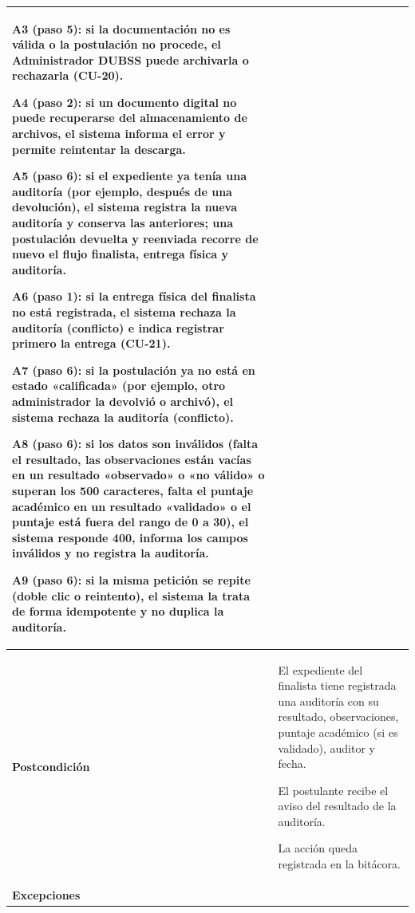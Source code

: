 \begin{longtable}{>{\raggedright\arraybackslash}p{2.9cm} >{\raggedright\arraybackslash}p{12.6cm}}
\begin{cuvin}
    \item A3 (paso 5): si la documentación no es válida o la postulación no procede, el Administrador DUBSS puede archivarla o rechazarla (CU-20).
    \item A4 (paso 2): si un documento digital no puede recuperarse del almacenamiento de archivos, el sistema informa el error y permite reintentar la descarga.
    \item A5 (paso 6): si el expediente ya tenía una auditoría (por ejemplo, después de una devolución), el sistema registra la nueva auditoría y conserva las anteriores; una postulación devuelta y reenviada recorre de nuevo el flujo finalista, entrega física y auditoría.
    \item A6 (paso 1): si la entrega física del finalista no está registrada, el sistema rechaza la auditoría (conflicto) e indica registrar primero la entrega (CU-21).
    \item A7 (paso 6): si la postulación ya no está en estado «calificada» (por ejemplo, otro administrador la devolvió o archivó), el sistema rechaza la auditoría (conflicto).
    \item A8 (paso 6): si los datos son inválidos (falta el resultado, las observaciones están vacías en un resultado «observado» o «no válido» o superan los 500 caracteres, falta el puntaje académico en un resultado «validado» o el puntaje está fuera del rango de 0 a 30), el sistema responde 400, informa los campos inválidos y no registra la auditoría.
    \item A9 (paso 6): si la misma petición se repite (doble clic o reintento), el sistema la trata de forma idempotente y no duplica la auditoría.
\end{cuvin} \\
\midrule
\textbf{Postcondición} & \vspace{-\baselineskip}\begin{cuvin}
    \item El expediente del finalista tiene registrada una auditoría con su resultado, observaciones, puntaje académico (si es validado), auditor y fecha.
    \item El postulante recibe el aviso del resultado de la auditoría.
    \item La acción queda registrada en la bitácora.
\end{cuvin} \\
\midrule
\textbf{Excepciones} & \vspace{-\baselineskip}\begin{cuvin}

\end{cuvin}
\end{longtable}
